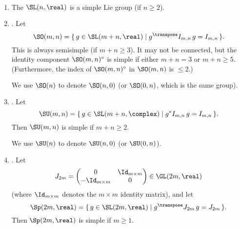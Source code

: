 \begin{eg} \label{classical-fulllinear} \ 
\noprelistbreak {}
 \begin{enumerate}
 \item The \/ $\SL(n,\real)$ is a
simple Lie group (if $n \ge 2$). 

 \item {}. Let
 $$ \SO(m,n) = \{\, g \in \SL(m+n,\real) \mid g^\transpose
I_{m,n} \, g = I_{m,n} \,\} .$$
This is always semisimple (if $m + n \ge 3$).
It may not be connected, but the identity component $\SO(m,n)^\circ$ is simple if either $m+n = 3$ or $m+n \ge 5$. 
(Furthermore, the index of $\SO(m,n)^\circ$ in $\SO(m,n)$ is $\le 2$.)

We use $\SO(n)$ to denote
$\SO(n,0)$ (or $\SO(0,n)$, which is the same group).


 \item {}. Let
 $$ \SU(m,n) = \{\, g \in \SL(m+n,\complex) \mid g^*
I_{m,n} \, g = I_{m,n} \,\} .$$
 Then $\SU(m,n)$ is simple if $m+n \ge 2$. 

We use $\SU(n)$ to denote $\SU(n,0)$ (or $\SU(0,n)$).

 \item {}. Let 
 $$J_{2m} = \begin{pmatrix}
 0 & \Id_{m\times m} \\
 -\Id_{m\times m} & 0
 \end{pmatrix}
 \in \GL(2m,\real) $$
 (where $\Id_{m\times m}$ denotes the $m \times m$ identity
matrix),
 and let 
 $$ \Sp(2m,\real) = \{\, g \in \SL(2m,\real) \mid
g^\transpose J_{2m} \, g = J_{2m} \,\} .$$
 Then $\Sp(2m,\real)$ is simple if $m \ge 1$. 
 \end{enumerate}
 \end{eg}

